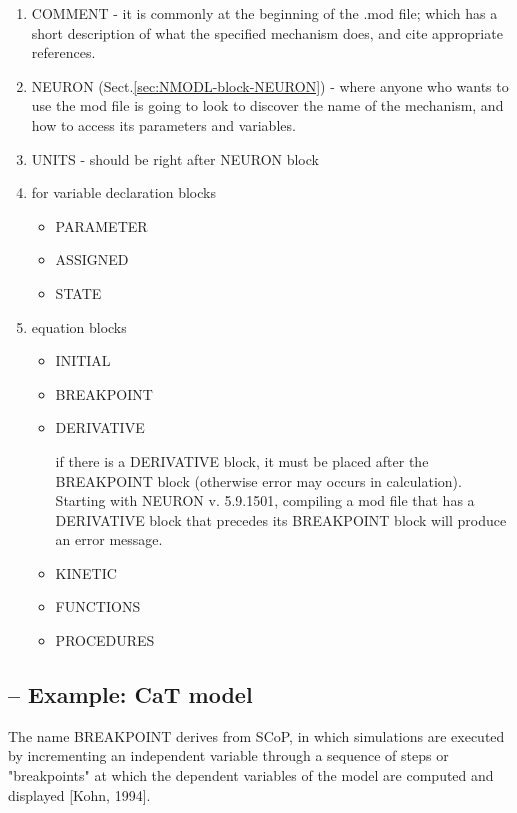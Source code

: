 \begin{enumerate}
  \item COMMENT - it is commonly at the beginning of the .mod file;
  which has a short description of what the specified mechanism does, and cite appropriate 
references. 
  
  \item NEURON (Sect.\ref{sec:NMODL-block-NEURON}) -   where anyone who wants to
  use the mod file is going to look to discover the name of the mechanism, and how to access its 
parameters and variables. 

  \item UNITS - should be right after NEURON block
 
  \item for variable declaration blocks
  \begin{itemize}
    \item PARAMETER 
  
    \item ASSIGNED
  
    \item STATE
  \end{itemize} 

  \item equation blocks
  \begin{itemize}
    \item INITIAL
    \item BREAKPOINT
    \item DERIVATIVE

if there is a DERIVATIVE block, it must be placed 
after the BREAKPOINT block (otherwise error may occurs in calculation).
Starting with NEURON v. 5.9.1501, compiling a mod file that has a DERIVATIVE 
block that precedes its BREAKPOINT block will produce an error message.


    \item KINETIC
    \item FUNCTIONS
    \item PROCEDURES 
  \end{itemize}
\end{enumerate}

\subsection{-- Example: CaT model}

The name BREAKPOINT derives from SCoP, in which simulations are executed by
incrementing an independent variable through a sequence of steps or
"breakpoints" at which the dependent variables of the model are computed and
displayed [Kohn, 1994].

